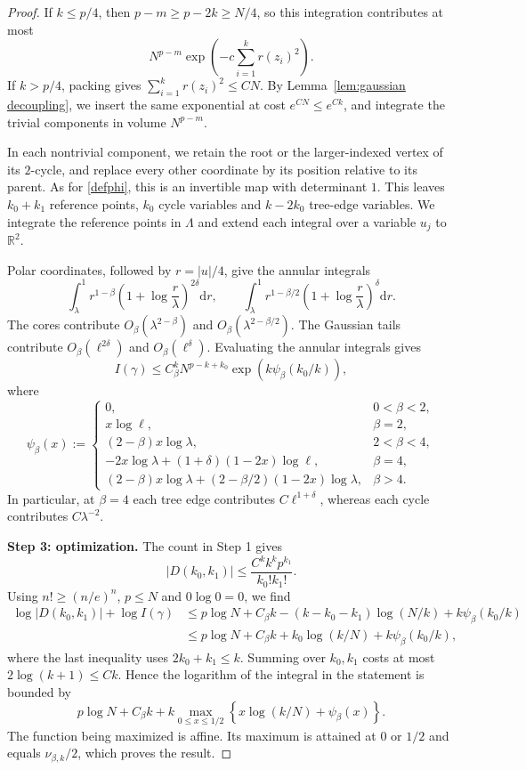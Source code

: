 \documentclass[a4paper,10pt,leqno]{amsart}
\numberwithin{equation}{section}
\newcommand{\R}{\mathbb{R}}
\newcommand{\dd}{\mathrm{d}}
\begin{document}
\begin{proof}
  If $k\le p/4$, then $p-m\ge p-2k\ge N/4$, so this integration contributes at most
  \[
    N^{p-m}\exp\left(-c\sum_{i=1}^k r(z_i)^2\right).
  \]
  If $k>p/4$, packing gives $\sum_{i=1}^k r(z_i)^2\le CN$. By Lemma~\ref{lem:gaussian decoupling}, we insert the same exponential at cost $e^{CN}\le e^{Ck}$, and integrate the trivial components in volume $N^{p-m}$.

  In each nontrivial component, we retain the root or the larger-indexed vertex of its $2$-cycle, and replace every other coordinate by its position relative to its parent. As for \eqref{defphi}, this is an invertible map with determinant $1$. This leaves $k_0+k_1$ reference points, $k_0$ cycle variables and $k-2k_0$ tree-edge variables. We integrate the reference points in $\Lambda$ and extend each integral over a variable $u_j$ to $\R^2$.

  Polar coordinates, followed by $r=|u|/4$, give the annular integrals
  \[
    \int_\lambda^1 r^{1-\beta}\left(1+\log\frac r\lambda\right)^{2\delta}\dd r,
    \qquad
    \int_\lambda^1 r^{1-\beta/2}\left(1+\log\frac r\lambda\right)^\delta\dd r.
  \]
  The cores contribute $O_\beta(\lambda^{2-\beta})$ and $O_\beta(\lambda^{2-\beta/2})$. The Gaussian tails contribute $O_\beta(\ell^{2\delta})$ and $O_\beta(\ell^\delta)$. Evaluating the annular integrals gives
  \[
    I(\gamma)\le C_\beta^k N^{p-k+k_0}
    \exp\left(k\psi_\beta(k_0/k)\right),
  \]
  where
  \[
    \psi_\beta(x):=\begin{cases}
      0,&0<\beta<2,\\
      x\log\ell,&\beta=2,\\
      (2-\beta)x\log\lambda,&2<\beta<4,\\
      -2x\log\lambda+(1+\delta)(1-2x)\log\ell,&\beta=4,\\
      (2-\beta)x\log\lambda+(2-\beta/2)(1-2x)\log\lambda,&\beta>4.
    \end{cases}
  \]
  In particular, at $\beta=4$ each tree edge contributes $C\ell^{1+\delta}$, whereas each cycle contributes $C\lambda^{-2}$.

  \noindent
  \textbf{Step 3: optimization.}
  The count in Step 1 gives
  \[
    |D(k_0,k_1)|\le\frac{C^k k^k p^{k_1}}{k_0!k_1!}.
  \]
  Using $n!\ge(n/e)^n$, $p\le N$ and $0\log0=0$, we find
  \begin{align*}
    \log|D(k_0,k_1)|+\log I(\gamma)
    &\le p\log N+C_\beta k
    -(k-k_0-k_1)\log(N/k)+k\psi_\beta(k_0/k)\\
    &\le p\log N+C_\beta k
    +k_0\log(k/N)+k\psi_\beta(k_0/k),
  \end{align*}
  where the last inequality uses $2k_0+k_1\le k$. Summing over $k_0,k_1$ costs at most $2\log(k+1)\le Ck$. Hence the logarithm of the integral in the statement is bounded by
  \[
    p\log N+C_\beta k+
    k\max_{0\le x\le1/2}\left\{x\log(k/N)+\psi_\beta(x)\right\}.
  \]
  The function being maximized is affine. Its maximum is attained at $0$ or $1/2$ and equals $\nu_{\beta,k}/2$, which proves the result.
\end{proof}
\end{document}
